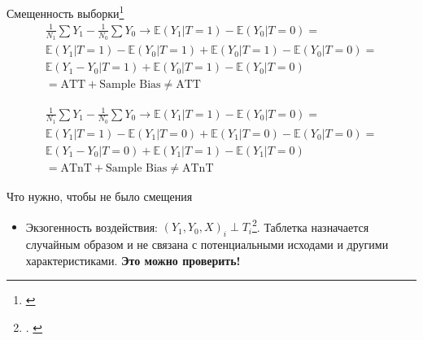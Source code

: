 \begin{frame}{Смещенность выборки\footnote{\cite[Раздел 3.2.1]{angrist2008mostly}}}
\begin{gather*}
\frac{1}{N_1}\sum Y_1 - \frac{1}{N_0}\sum Y_0 \longrightarrow \mathbb{E}(Y_1|T = 1) -  \mathbb{E}(Y_0|T = 0) = \\ \mathbb{E}(Y_1|T = 1) - \mathbb{E}(Y_0|T = 1) + \mathbb{E}(Y_0|T = 1) - \mathbb{E}(Y_0|T = 0) = \\ \mathbb{E}(Y_1-Y_0|T = 1) + \mathbb{E}(Y_0|T = 1) - \mathbb{E}(Y_0|T = 0) \\
 {= \text{ATT} + \text{Sample Bias} \neq \text{ATT}}
\end{gather*}


\begin{gather*}
\frac{1}{N_1}\sum Y_1 - \frac{1}{N_0}\sum Y_0 \longrightarrow \mathbb{E}(Y_1|T = 1) -  \mathbb{E}(Y_0|T = 0) = \\ \mathbb{E}(Y_1|T = 1) - \mathbb{E}(Y_1|T = 0) + \mathbb{E}(Y_1|T = 0) - \mathbb{E}(Y_0|T = 0) = \\ \mathbb{E}(Y_1-Y_0|T = 0) + \mathbb{E}(Y_1|T = 1) - \mathbb{E}(Y_1|T = 0) \\{= \text{ATnT} + \text{Sample Bias} \neq \text{ATnT}}
\end{gather*}

\end{frame}

\begin{frame}{Что нужно, чтобы не было смещения}

\begin{itemize}
    \item Экзогенность воздействия: $(Y_1, Y_0, X)_i \perp T_i$\footnote{\cite[Раздел 2]{angrist2008mostly}. \cite[Глава 3]{imbens2015causal}}. Таблетка назначается случайным образом и не связана с потенциальными исходами и другими характеристиками. \textbf{Это можно проверить!} 
\end{itemize}

\end{frame}




